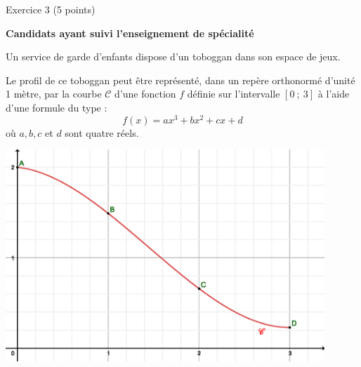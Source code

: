 
%
\begin{h2}Exercice 3 (5 points)\end{h2}
\par
\textbf{Candidats ayant suivi l'enseignement de spécialité}
\par
%
%
\par
Un service de garde d'enfants dispose d'un toboggan dans son espace de jeux.
\par
Le profil de ce toboggan peut être représenté, dans un repère orthonormé d'unité 1 mètre, par la courbe $\mathscr{C}$ d'une fonction $f$ définie sur l'intervalle $[0~;~3]$ à l'aide d'une formule du type :
\[ f(x)=ax^3+bx^2+cx+d \]
où $a, b, c$ et $d$ sont quatre réels.
\par
\begin{center}
     \begin{extern}%
          \includegraphics[width=0.9\textwidth]{images/BBESL-spe-4-1}%
     \end{extern}
\end{center}

